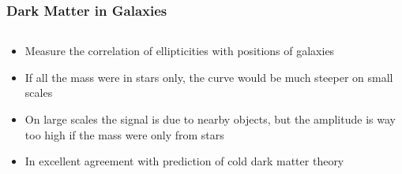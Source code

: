 \documentclass{beamer}
\begin{document}
\frame
{

    \frametitle{Dark Matter in Galaxies}


    \begin{columns}
        \begin{column}{0.5\textwidth}
            \begin{itemize}

                \item Measure the correlation of ellipticities with
                    positions of galaxies

                \item If all the mass were in stars only, the curve would
                    be much steeper on small scales

                \item On large scales the signal is due to nearby objects, but
                    the amplitude is way too high if the mass were only from
                    stars

                \item In excellent agreement with prediction of cold dark
                    matter theory

            \end{itemize}


\end{column}
\end{columns}}
\end{document}
